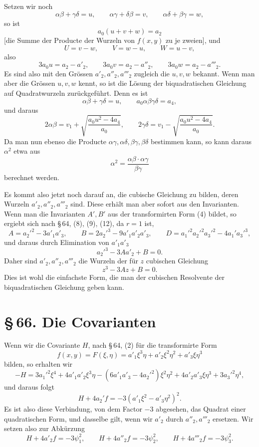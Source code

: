 \documentclass[11pt]{article}
\providecommand{\sect}[2]{\section*{\S\,#1. #2}}
\begin{document}
Setzen wir noch
\begin{equation}
 \alpha\beta+\gamma\delta=u,
 \qquad
 \alpha\gamma+\delta\beta=v,
 \qquad
 \alpha\delta+\beta\gamma=w,
\tag{9}
\end{equation}
so ist
\[
 a_0(u+v+w)=a_2
\]
[die Summe der Producte der Wurzeln von $f(x,y)$ zu je zweien], und
\[
 U=v-w,
 \qquad
 V=w-u,
 \qquad
 W=u-v,
\]
also
\begin{equation}
 3a_0u=a_2-a'_2,
 \qquad
 3a_0v=a_2-a''_2,
 \qquad
 3a_0w=a_2-a'''_2.
\tag{10}
\end{equation}
Es sind also mit den Grössen $a'_2,a''_2,a'''_2$ zugleich die $u,v,w$ bekannt. Wenn man aber die Grössen $u,v,w$ kennt, so ist die Lösung der biquadratischen Gleichung auf Quadratwurzeln zurückgeführt. Denn es ist
\[
 \alpha\beta+\gamma\delta=u,
 \qquad
 a_0\alpha\beta\gamma\delta=a_4,
\]
und daraus
\[
 2\alpha\beta=v_1+\sqrt{\frac{a_0u^2-4a_4}{a_0}},
 \qquad
 2\gamma\delta=v_1-\sqrt{\frac{a_0u^2-4a_4}{a_0}}.
\]
Da man nun ebenso die Producte $\alpha\gamma,\alpha\delta,\beta\gamma,\beta\delta$ bestimmen kann, so kann daraus $\alpha^2$ etwa aus
\[
 \alpha^2=\frac{\alpha\beta\cdot\alpha\gamma}{\beta\gamma}
\]
berechnet werden.

Es kommt also jetzt noch darauf an, die cubische Gleichung zu bilden, deren Wurzeln $a'_2,a''_2,a'''_2$ sind. Diese erhält man aber sofort aus den Invarianten. Wenn man die Invarianten $A',B'$ aus der transformirten Form (4) bildet, so ergiebt sich nach \S\,64, (8), (9), (12), da $r=1$ ist,
\begin{equation}
 A=a_2'^2-3a'_1a'_3,
 \qquad
 B=2a_2'^3-9a'_1a'_2a'_3,
 \qquad
 D=a_1'^2a_2'^2a_3'^2-4a_1'a_3'^3,
\tag{11}
\end{equation}
und daraus durch Elimination von $a'_1a'_3$
\[
 a_2'^3-3Aa'_2+B=0.
\]
Daher sind $a'_2,a''_2,a'''_2$ die Wurzeln der für $z$ cubischen Gleichung
\begin{equation}
 z^3-3Az+B=0.
\tag{12}
\end{equation}
Dies ist wohl die einfachste Form, die man der cubischen Resolvente der biquadratischen Gleichung geben kann.

\sect{66}{Die Covarianten}

Wenn wir die Covariante $H$, nach \S\,64, (2) für die transformirte Form
\begin{equation}
 f(x,y)=F(\xi,\eta)=a'_1\xi^3\eta+a'_2\xi^2\eta^2+a'_3\xi\eta^3
\tag{1}
\end{equation}
bilden, so erhalten wir
\begin{equation}
 -H=3a_1'^2\xi^4+4a'_1a'_2\xi^3\eta-(6a'_1a'_3-4a_2'^2)\xi^2\eta^2+4a'_2a'_3\xi\eta^3+3a_3'^2\eta^4,
\tag{2}
\end{equation}
und daraus folgt
\begin{equation}
 H+4a_2'f=-3(a'_1\xi^2-a'_3\eta^2)^2.
\tag{3}
\end{equation}
Es ist also diese Verbindung, von dem Factor $-3$ abgesehen, das Quadrat einer quadratischen Form, und dasselbe gilt, wenn wir $a'_2$ durch $a''_2,a'''_2$ ersetzen. Wir setzen also zur Abkürzung
\begin{equation}
 H+4a'_2f=-3\psi_1^2,
 \qquad
 H+4a''_2f=-3\psi_2^2,
 \qquad
 H+4a'''_2f=-3\psi_3^2.
\tag{4}
\end{equation}
\end{document}
